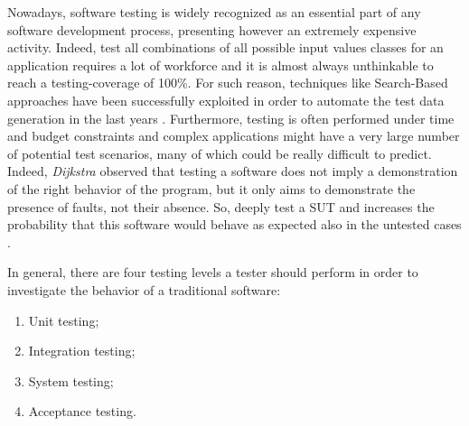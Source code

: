 Nowadays, software testing is widely recognized as an essential part of any software development process, presenting however an extremely expensive activity. Indeed, test all combinations of all possible input values classes for an application \cite{glinz} requires a lot of workforce and it is almost always unthinkable to reach a testing-coverage of 100\%. For such reason, techniques like Search-Based approaches have been successfully exploited in order to automate the test data generation in the last years \cite{Harman_et_al_2015}.
Furthermore, testing is often performed under time and budget constraints \cite{grano} and complex applications might have a very large number of potential test scenarios, many of which could be really difficult to predict. Indeed, \textit{Dijkstra} \cite{dijkstra} observed that testing a software does not imply a demonstration of the right behavior of the program, but it only aims to demonstrate the presence of faults, not their absence. 
So, deeply test a SUT and increases the probability that this software would behave as expected also in the untested cases \cite{glinz}. 

In general, there are four testing levels a tester should perform in order to investigate the behavior of a traditional software: 
\begin{enumerate}
\item Unit testing; 
\item Integration testing; 
\item System testing; 
\item Acceptance testing.
\end{enumerate}

